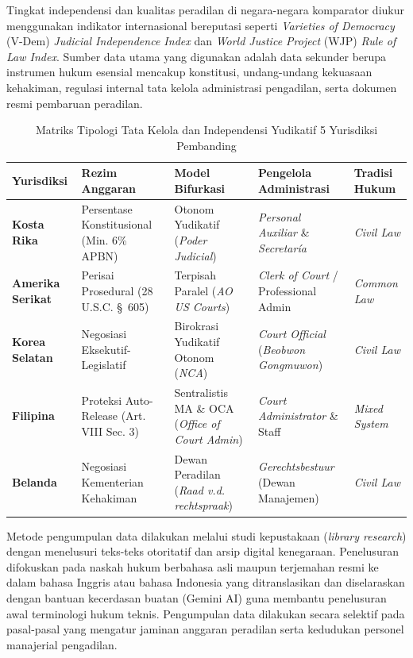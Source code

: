 \documentclass[12pt, a4paper]{article}
\begin{document}
Tingkat independensi dan kualitas peradilan di negara-negara komparator diukur menggunakan indikator internasional bereputasi seperti \textit{Varieties of Democracy} (V-Dem) \textit{Judicial Independence Index} dan \textit{World Justice Project} (WJP) \textit{Rule of Law Index}. Sumber data utama yang digunakan adalah data sekunder berupa instrumen hukum esensial mencakup konstitusi, undang-undang kekuasaan kehakiman, regulasi internal tata kelola administrasi pengadilan, serta dokumen resmi pembaruan peradilan.

\begin{table}[H]
\centering
\fontsize{9}{11}\selectfont
\caption{Matriks Tipologi Tata Kelola dan Independensi Yudikatif 5 Yurisdiksi Pembanding}
\label{tab:matriks-tipologi}
\renewcommand{\arraystretch}{1.3}
\begin{tabular}{p{2.5cm} p{3.2cm} p{3.5cm} p{3.5cm} p{2.2cm}}
\hline
\textbf{Yurisdiksi} & \textbf{Rezim Anggaran} & \textbf{Model Bifurkasi} & \textbf{Pengelola Administrasi} & \textbf{Tradisi Hukum} \\
\hline
\raggedright\textbf{Kosta Rika} & Persentase Konstitusional (Min. 6\% APBN) & Otonom Yudikatif (\textit{Poder Judicial}) & \textit{Personal Auxiliar} \& \textit{Secretaría} & \textit{Civil Law} \\
\raggedright\textbf{Amerika Serikat} & Perisai Prosedural (28 U.S.C. \S~605) & Terpisah Paralel (\textit{AO US Courts}) & \textit{Clerk of Court} / Professional Admin & \textit{Common Law} \\
\raggedright\textbf{Korea Selatan} & Negosiasi Eksekutif-Legislatif & Birokrasi Yudikatif Otonom (\textit{NCA}) & \textit{Court Official} (\textit{Beobwon Gongmuwon}) & \textit{Civil Law} \\
\raggedright\textbf{Filipina} & Proteksi Auto-Release (Art. VIII Sec. 3) & Sentralistis MA \& OCA (\textit{Office of Court Admin}) & \textit{Court Administrator} \& Staff & \textit{Mixed System} \\
\raggedright\textbf{Belanda} & Negosiasi Kementerian Kehakiman & Dewan Peradilan (\textit{Raad v.d. rechtspraak}) & \textit{Gerechtsbestuur} (Dewan Manajemen) & \textit{Civil Law} \\
\hline
\end{tabular}
\end{table}

Metode pengumpulan data dilakukan melalui studi kepustakaan (\textit{library research}) dengan menelusuri teks-teks otoritatif dan arsip digital kenegaraan. Penelusuran difokuskan pada naskah hukum berbahasa asli maupun terjemahan resmi ke dalam bahasa Inggris atau bahasa Indonesia yang ditranslasikan dan diselaraskan dengan bantuan kecerdasan buatan (Gemini AI) guna membantu penelusuran awal terminologi hukum teknis. Pengumpulan data dilakukan secara selektif pada pasal-pasal yang mengatur jaminan anggaran peradilan serta kedudukan personel manajerial pengadilan.
\end{document}
